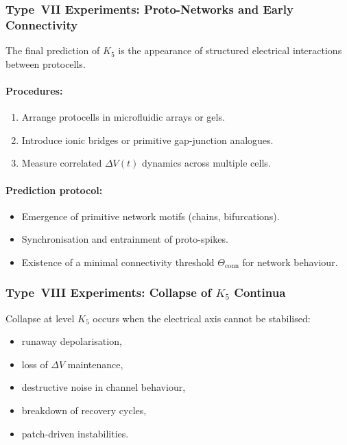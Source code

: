 \subsubsection{Type~VII Experiments: Proto-Networks and Early Connectivity}

The final prediction of $K_5$ is the appearance of structured 
electrical interactions between protocells.

\paragraph{Procedures:}

\begin{enumerate}
    \item Arrange protocells in microfluidic arrays or gels.
    \item Introduce ionic bridges or primitive gap-junction analogues.
    \item Measure correlated $\Delta V(t)$ dynamics across multiple cells.
\end{enumerate}

\paragraph{Prediction protocol:}

\begin{itemize}
    \item Emergence of primitive network motifs (chains, bifurcations).
    \item Synchronisation and entrainment of proto-spikes.
    \item Existence of a minimal connectivity threshold 
          $\Theta_{\mathrm{conn}}$ for network behaviour.
\end{itemize}



\subsubsection{Type~VIII Experiments: Collapse of \texorpdfstring{$K_5$}{K5} Continua}

Collapse at level $K_5$ occurs when the electrical axis 
cannot be stabilised:

\begin{itemize}
    \item runaway depolarisation,
    \item loss of $\Delta V$ maintenance,
    \item destructive noise in channel behaviour,
    \item breakdown of recovery cycles,
    \item patch-driven instabilities.
\end{itemize}

